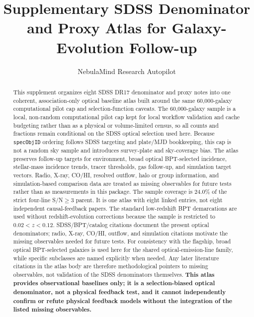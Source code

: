 \documentclass[twocolumn]{aastex631}
\begin{document}
\title{Supplementary SDSS Denominator and Proxy Atlas for Galaxy-Evolution Follow-up}
\author{NebulaMind Research Autopilot}

\begin{abstract}
This supplement organizes eight SDSS DR17 denominator and proxy notes into one coherent, association-only optical baseline atlas built around the same 60,000-galaxy computational pilot cap and selection-function caveats. The 60,000-galaxy sample is a local, non-random computational pilot cap kept for local workflow validation and cache budgeting rather than as a physical or volume-limited census, so all counts and fractions remain conditional on the SDSS optical selection used here. Because \texttt{specObjID} ordering follows SDSS targeting and plate/MJD bookkeeping, this cap is not a random sky sample and introduces survey-plate and sky-coverage bias. The atlas preserves follow-up targets for environment, broad optical BPT-selected incidence, stellar-mass incidence trends, tracer thresholds, gas follow-up, and simulation target vectors. Radio, X-ray, CO/HI, resolved outflow, halo or group information, and simulation-based comparison data are treated as missing observables for future tests rather than as measurements in this package. The sample coverage is 24.0\% of the strict four-line S/N$\geq3$ parent. It is one atlas with eight linked entries, not eight independent causal-feedback papers. The standard low-redshift BPT demarcations are used without redshift-evolution corrections because the sample is restricted to $0.02<z<0.12$. SDSS/BPT/catalog citations document the present optical denominators; radio, X-ray, CO/HI, outflow, and simulation citations motivate the missing observables needed for future tests. For consistency with the flagship, broad optical BPT-selected galaxies is used here for the shared optical-emission-line family, while specific subclasses are named explicitly when needed. Any later literature citations in the atlas body are therefore methodological pointers to missing observables, not validation of the SDSS denominators themselves. \textbf{This atlas provides observational baselines only; it is a selection-biased optical denominator, not a physical feedback test, and it cannot independently confirm or refute physical feedback models without the integration of the listed missing observables.}
\end{abstract}

\end{document}
